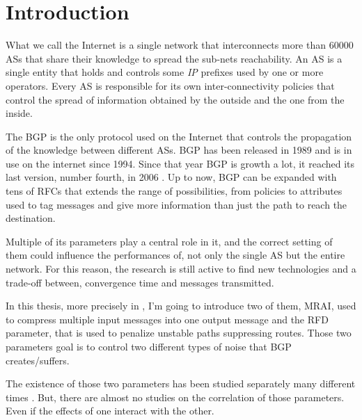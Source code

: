 \chapter{Introduction}
\label{cha:introduction}



What we call the Internet is a single network that interconnects more than \num{60000}
\acp{AS} that share their knowledge to spread the sub-nets reachability.
An \ac{AS} is a single entity that holds and controls some \textit{IP} prefixes
used by one or more operators.
Every \ac{AS} is responsible for its own inter-connectivity policies that control
the spread of information obtained by the outside and the one from the inside.

The \ac{BGP} is the only protocol used on the Internet that controls the propagation
of the knowledge between different \acp{AS}.
\ac{BGP} has been released in \num{1989} and is in use on the internet since
\num{1994}.
Since that year \ac{BGP} is growth a lot, it reached its last version, number
fourth, in \num{2006} \cite{rfc4271}.
Up to now, \ac{BGP} can be expanded with tens of \acp{RFC} that extends the
range of possibilities,
from policies to attributes used to tag messages and give more information than
just the path to reach the destination.

Multiple of its parameters play a central role in it, and the correct setting
of them could influence the performances of, not only the single \ac{AS} but
the entire network.
For this reason, the research is still active to find new technologies and
a trade-off between, convergence time and messages transmitted.

In this thesis, more precisely in , I'm going to introduce
two of them, \ac{MRAI}, used to compress multiple input messages into one
output message and the \ac{RFD} parameter, that is used to penalize unstable paths
suppressing routes.
Those two parameters goal is to control two different types of noise that
\ac{BGP} creates/suffers.

The existence of those two parameters has been studied separately many different
times \cite{fabrikant2011there,daggitt2018rate,qiu2005optimal,gray2020bgp}.
But, there are almost no studies on the correlation of those parameters.
Even if the effects of one interact with the other.

